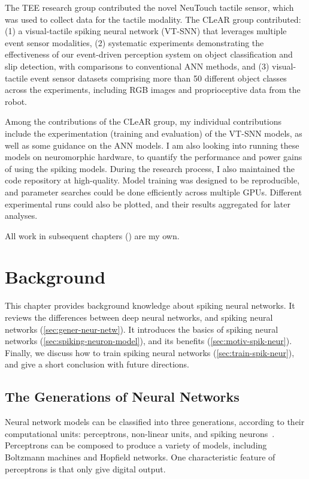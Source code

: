 \documentclass[fyp]{socreport}
\begin{document}
The TEE research group contributed the novel NeuTouch tactile sensor, which was
used to collect data for the tactile modality. The CLeAR group contributed: (1) a
visual-tactile spiking neural network (VT-SNN) that leverages multiple event
sensor modalities, (2) systematic experiments demonstrating the effectiveness of
our event-driven perception system on object classification and slip detection,
with comparisons to conventional ANN methods, and (3) visual-tactile event
sensor datasets comprising more than 50 different object classes across the
experiments, including RGB images and proprioceptive data from the robot.

Among the contributions of the CLeAR group, my individual contributions include
the experimentation (training and evaluation) of the VT-SNN models, as well as
some guidance on the ANN models. I am also looking into running these models on
neuromorphic hardware, to quantify the performance and power gains of using the
spiking models. During the research process, I also maintained the code
repository at high-quality. Model training was designed to be reproducible, and
parameter searches could be done efficiently across multiple GPUs. Different
experimental runs could also be plotted, and their results aggregated for later
analyses.

All work in subsequent chapters ()
are my own.

\chapter{Background\label{cha:background}}

This chapter provides background knowledge about spiking neural networks. It
reviews the differences between deep neural networks, and spiking neural
networks (\ref{sec:gener-neur-netw}). It introduces the basics of spiking neural
networks (\ref{sec:spiking-neuron-model}), and its benefits
(\ref{sec:motiv-spik-neur}). Finally, we discuss how to train spiking neural
networks (\ref{sec:train-spik-neur}), and give a short conclusion with future
directions.

\section{The Generations of Neural Networks\label{sec:gener-neur-netw}}

Neural network models can be classified into three generations, according to
their computational units: perceptrons, non-linear units, and spiking
neurons~\cite{MAASS19971659}. Perceptrons can be composed to produce a variety
of models, including Boltzmann machines and Hopfield networks. One
characteristic feature of perceptrons is that only give digital output.
\end{document}
